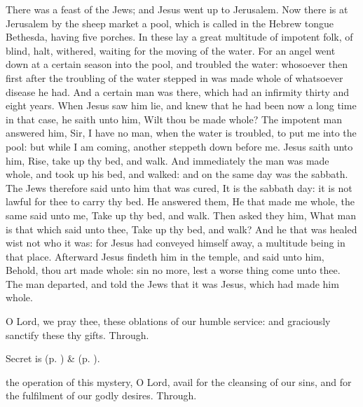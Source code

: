  There was a feast of the Jews; and Jesus went up to Jerusalem. Now there is at Jerusalem by the sheep market a pool, which is called in the Hebrew tongue Bethesda, having five porches. In these lay a great multitude of impotent folk, of blind, halt, withered, waiting for the moving of the water. For an angel went down at a certain season into the pool, and troubled the water: whosoever then first after the troubling of the water stepped in was made whole of whatsoever disease he had. And a certain man was there, which had an infirmity thirty and eight years. When Jesus saw him lie, and knew that he had been now a long time in that case, he saith unto him, Wilt thou be made whole? The impotent man answered him, Sir, I have no man, when the water is troubled, to put me into the pool: but while I am coming, another steppeth down before me. Jesus saith unto him, Rise, take up thy bed, and walk. And immediately the man was made whole, and took up his bed, and walked: and on the same day was the sabbath. The Jews therefore said unto him that was cured, It is the sabbath day: it is not lawful for thee to carry thy bed. He answered them, He that made me whole, the same said unto me, Take up thy bed, and walk. Then asked they him, What man is that which said unto thee, Take up thy bed, and walk? And he that was healed wist not who it was: for Jesus had conveyed himself away, a multitude being in that place. Afterward Jesus findeth him in the temple, and said unto him, Behold, thou art made whole: sin no more, lest a worse thing come unto thee. The man departed, and told the Jews that it was Jesus, which had made him whole.


\secret
{} O Lord, we pray thee, these oblations of our humble service: and graciously sanctify these thy gifts. Through.


\begin{rubric}
     Secret is  (p. \pageref{SPSaints}) \&   (p. \pageref{SPLivingDeparted}).
\end{rubric}


\postcommunion
{} the operation of this mystery, O Lord, avail for the cleansing of our sins, and for the fulfilment of our godly desires. Through.

